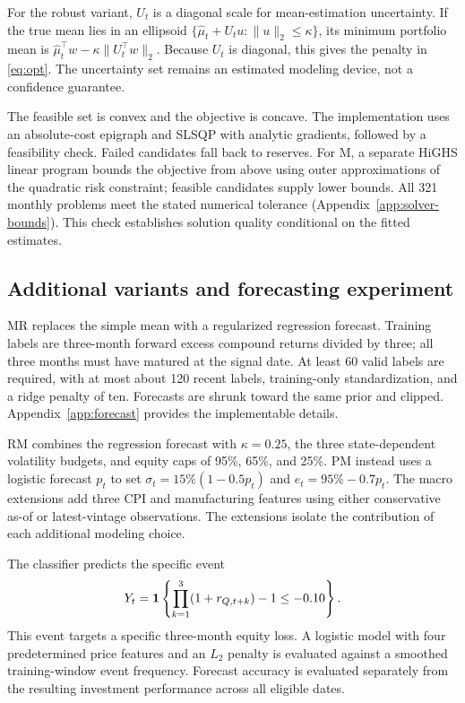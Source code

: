 \documentclass[12pt,letterpaper]{article}
\begin{document}
For the robust variant, $U_t$ is a diagonal scale for mean-estimation uncertainty. If the true mean lies in an ellipsoid $\{\widehat\mu_t+U_tu:\|u\|_2\le\kappa\}$, its minimum portfolio mean is $\widehat\mu_t^\top w-\kappa\|U_t^\top w\|_2$. Because $U_t$ is diagonal, this gives the penalty in \cref{eq:opt}. The uncertainty set remains an estimated modeling device, not a confidence guarantee.

The feasible set is convex and the objective is concave. The implementation uses an absolute-cost epigraph and SLSQP with analytic gradients, followed by a feasibility check. Failed candidates fall back to reserves. For M, a separate HiGHS linear program bounds the objective from above using outer approximations of the quadratic risk constraint; feasible candidates supply lower bounds. All 321 monthly problems meet the stated numerical tolerance (Appendix~\ref{app:solver-bounds}). This check establishes solution quality conditional on the fitted estimates.

\subsection{Additional variants and forecasting experiment}
MR replaces the simple mean with a regularized regression forecast. Training labels are three-month forward excess compound returns divided by three; all three months must have matured at the signal date. At least 60 valid labels are required, with at most about 120 recent labels, training-only standardization, and a ridge penalty of ten. Forecasts are shrunk toward the same prior and clipped. Appendix~\ref{app:forecast} provides the implementable details.

RM combines the regression forecast with $\kappa=0.25$, the three state-dependent volatility budgets, and equity caps of 95\%, 65\%, and 25\%. PM instead uses a logistic forecast $p_t$ to set $\sigma_t=15\%(1-0.5p_t)$ and $e_t=95\%-0.7p_t$. The macro extensions add three CPI and manufacturing features using either conservative as-of or latest-vintage observations. The extensions isolate the contribution of each additional modeling choice.

The classifier predicts the specific event
\begin{equation}
Y_t=\mathbf 1\left\{\prod_{k=1}^{3}(1+r_{Q,t+k})-1\le-0.10\right\}.\label{eq:label}
\end{equation}
This event targets a specific three-month equity loss. A logistic model with four predetermined price features and an $L_2$ penalty is evaluated against a smoothed training-window event frequency. Forecast accuracy is evaluated separately from the resulting investment performance across all eligible dates.
\end{document}
